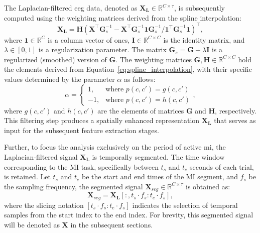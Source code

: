 The Laplacian-filtered \gls{eeg} data, denoted as $\mathbf{X_L} \in \mathbb{R}^{C \times \tau}$, is subsequently computed using the weighting matrices derived from the spline interpolation:
%
\begin{equation}
    \mathbf{X_L} = \mathbf{H}\left(\mathbf{X}^{\top}\mathbf{G}_{s}^{-1} - \mathbf{X}^{\top}\mathbf{G}_{s}^{-1}\mathbf{1}\mathbf{G}_{s}^{-1}/\mathbf{1}^{\top}\mathbf{G}_{s}^{-1}\mathbf{1}\right)^{\top},
    \label{eq:laplacian_filter}
\end{equation}
%
where $\mathbf{1} \in \mathbb{R}^{C}$ is a column vector of ones, $\mathbf{I} \in \mathbb{R}^{C \times C}$ is the identity matrix, and $\lambda \in [0, 1]$ is a regularization parameter. The matrix $\mathbf{G}_s = \mathbf{G} + \lambda\mathbf{I}$ is a regularized (smoothed) version of $\mathbf{G}$. The weighting matrices $\mathbf{G}, \mathbf{H} \in \mathbb{R}^{C \times C}$ hold the elements derived from Equation~\eqref{eq:spline_interpolation}, with their specific values determined by the parameter $\alpha$ as follows:
%
\begin{equation}
    \alpha = 
    \begin{cases} 
        1, & \text{where } p(c,c') = g(c,c') \\ 
        -1, & \text{where } p(c,c') = h(c,c') 
    \end{cases},
\end{equation}
%
where $g(c,c')$ and $h(c,c')$ are the elements of matrices $\mathbf{G}$ and $\mathbf{H}$, respectively. This filtering step produces a spatially enhanced representation $\mathbf{X_L}$ that serves as input for the subsequent feature extraction stages.

Further, to focus the analysis exclusively on the period of active \gls{mi}, the Laplacian-filtered signal $\mathbf{X_L}$ is temporally segmented. The time window corresponding to the MI task, specifically between $t_s$ and $t_e$ seconds of each trial, is retained. Let $t_s$ and $t_e$ be the start and end times of the MI segment, and $f_s$ be the sampling frequency, the segmented signal $\mathbf{X}_{seg} \in \mathbb{R}^{C \times \tau}$ is obtained as:
%
\begin{equation}
    \mathbf{X}_{seg} = \mathbf{X_L}[:, t_s \cdot f_s : t_e \cdot f_s],
    \label{eq:segmentation}
\end{equation}
%
where the slicing notation $[t_s \cdot f_s : t_e \cdot f_s]$ indicates the selection of temporal samples from the start index to the end index. For brevity, this segmented signal will be denoted as $\mathbf{X}$ in the subsequent sections.

